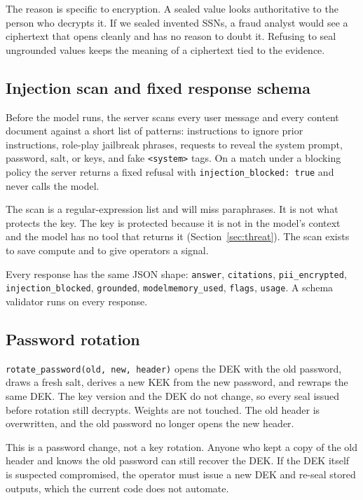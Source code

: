 \documentclass[11pt]{article}
\newcommand{\code}[1]{\texttt{#1}}
\begin{document}
The reason is specific to encryption. A sealed value looks authoritative to the person who decrypts it. If we sealed invented SSNs, a fraud analyst would see a ciphertext that opens cleanly and has no reason to doubt it. Refusing to seal ungrounded values keeps the meaning of a ciphertext tied to the evidence.

\subsection{Injection scan and fixed response schema}
\label{sec:injection}

Before the model runs, the server scans every user message and every content document against a short list of patterns: instructions to ignore prior instructions, role-play jailbreak phrases, requests to reveal the system prompt, password, salt, or keys, and fake \code{<system>} tags. On a match under a blocking policy the server returns a fixed refusal with \code{injection\_blocked: true} and never calls the model.

The scan is a regular-expression list and will miss paraphrases. It is not what protects the key. The key is protected because it is not in the model's context and the model has no tool that returns it (Section~\ref{sec:threat}). The scan exists to save compute and to give operators a signal.

{\sloppy Every response has the same JSON shape: \code{answer}, \code{citations}, \code{pii\_encrypted}, \code{injection\_blocked}, \code{grounded}, \code{modelmemory\_used}, \code{flags}, \code{usage}. A schema validator runs on every response.\par}

\subsection{Password rotation}
\label{sec:rotation}

\code{rotate\_password(old, new, header)} opens the DEK with the old password, draws a fresh salt, derives a new KEK from the new password, and rewraps the same DEK. The key version and the DEK do not change, so every seal issued before rotation still decrypts. Weights are not touched. The old header is overwritten, and the old password no longer opens the new header.

This is a password change, not a key rotation. Anyone who kept a copy of the old header and knows the old password can still recover the DEK. If the DEK itself is suspected compromised, the operator must issue a new DEK and re-seal stored outputs, which the current code does not automate.
\end{document}

